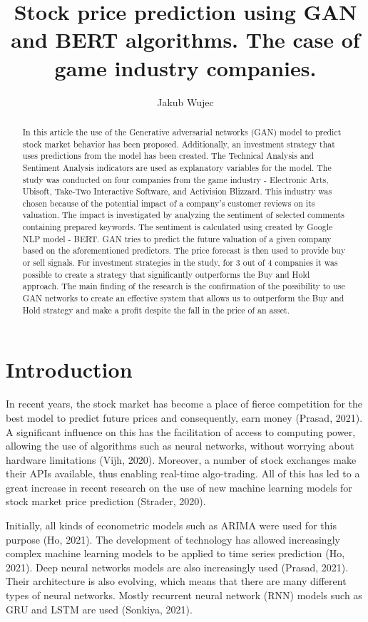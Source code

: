 \documentclass[11pt]{article} %
\title{Stock price prediction using GAN and BERT algorithms. The case of game industry companies.}
\author{Jakub Wujec}
\begin{document}
\maketitle


\begin{abstract} In this article the use of the Generative adversarial networks (GAN) model to predict stock market behavior has been proposed. Additionally, an investment strategy that uses predictions from the model has been created. The Technical Analysis and Sentiment Analysis indicators are used as explanatory variables for the model. The study was conducted on four companies from the game industry -  Electronic Arts, Ubisoft, Take-Two Interactive Software, and Activision Blizzard.  This industry was chosen because of the potential impact of a company's customer reviews on its valuation. The impact is investigated by analyzing the sentiment of selected comments containing prepared keywords. The sentiment is calculated using created by Google NLP model - BERT. GAN tries to predict the future valuation of a given company based on the aforementioned predictors. The price forecast is then used to provide buy or sell signals. For investment strategies in the study, for 3 out of 4 companies it was possible to create a strategy that significantly outperforms the Buy and Hold approach. The main finding of the research is the confirmation of the possibility to use GAN networks to create an effective system that allows us to outperform the Buy and Hold strategy and make a profit despite the fall in the price of an asset.
\end{abstract}

\section{Introduction}
In recent years, the stock market has become a place of fierce competition for the best model to predict future prices and consequently, earn money (Prasad, 2021). 
A significant influence on this has the facilitation of access to computing power, allowing the use of algorithms such as neural networks, without worrying about hardware limitations (Vijh, 2020). Moreover, a number of stock exchanges make their APIs available, thus enabling real-time algo-trading. All of this has led to a great increase in recent research on the use of new machine learning models for stock market price prediction (Strader, 2020).  

Initially, all kinds of econometric models such as ARIMA were used for this purpose (Ho, 2021). The development of technology has allowed increasingly complex machine learning models to be applied to time series prediction  (Ho, 2021). Deep neural networks models are also increasingly used (Prasad, 2021). Their architecture is also evolving, which means that there are many different types of neural networks. Mostly recurrent neural network (RNN) models such as GRU and LSTM are used (Sonkiya, 2021). 
\end{document}
